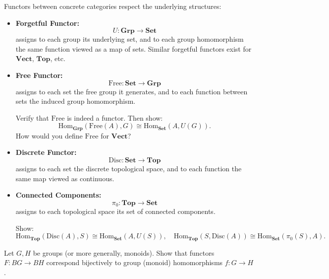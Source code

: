 \begin{example}
Functors between concrete categories respect the underlying structures:
\begin{itemize}
    \item \textbf{Forgetful Functor:}
    \[
    U: \mathbf{Grp} \to \mathbf{Set}
    \]
    assigns to each group its underlying set, and to each group homomorphism the same function viewed as a map of sets. Similar forgetful functors exist for $\mathbf{Vect}$, $\mathbf{Top}$, etc.

    \item \textbf{Free Functor:}
    \[
    \mathrm{Free}: \mathbf{Set} \to \mathbf{Grp}
    \]
    assigns to each set the free group it generates, and to each function between sets the induced group homomorphism.

    \begin{exercise}
    Verify that $\mathrm{Free}$ is indeed a functor. Then show:
    \[
    \mathrm{Hom}_{\mathbf{Grp}}(\mathrm{Free}(A), G) \cong \mathrm{Hom}_{\mathbf{Set}}(A, U(G)).
    \]
    How would you define $\mathrm{Free}$ for $\mathbf{Vect}$?
    \end{exercise}

    \item \textbf{Discrete Functor:}
    \[
    \mathrm{Disc}: \mathbf{Set} \to \mathbf{Top}
    \]
    assigns to each set the discrete topological space, and to each function the same map viewed as continuous.

    \item \textbf{Connected Components:}
    \[
    \pi_0: \mathbf{Top} \to \mathbf{Set}
    \]
    assigns to each topological space its set of connected components.

    \begin{exercise}
    Show:
    \[
    \mathrm{Hom}_{\mathbf{Top}}(\mathrm{Disc}(A), S) \cong \mathrm{Hom}_{\mathbf{Set}}(A, U(S)), \quad
    \mathrm{Hom}_{\mathbf{Top}}(S, \mathrm{Disc}(A)) \cong \mathrm{Hom}_{\mathbf{Set}}(\pi_0(S), A).
    \]
    \end{exercise}
\end{itemize}
\end{example}

\begin{exercise}
Let $G, H$ be groups (or more generally, monoids). Show that functors $F: BG \to BH$ correspond bijectively to group (monoid) homomorphisms $f: G \to H$.
\end{exercise}

